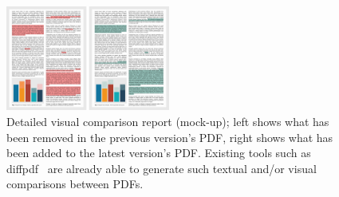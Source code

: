\begin{figure}
    \includegraphics[width=0.48\textwidth]{figures/paper-pdf-delta.png}
    \caption{Detailed visual comparison report (mock-up); left shows what has been removed in the previous version's PDF, right shows what has been added to the latest version's PDF. Existing tools such as diffpdf~\cite{diffpdf} are already able to generate such textual and/or visual comparisons between PDFs.}
    \label{fig:paper-pdf-delta}
\end{figure}


\clearpage

